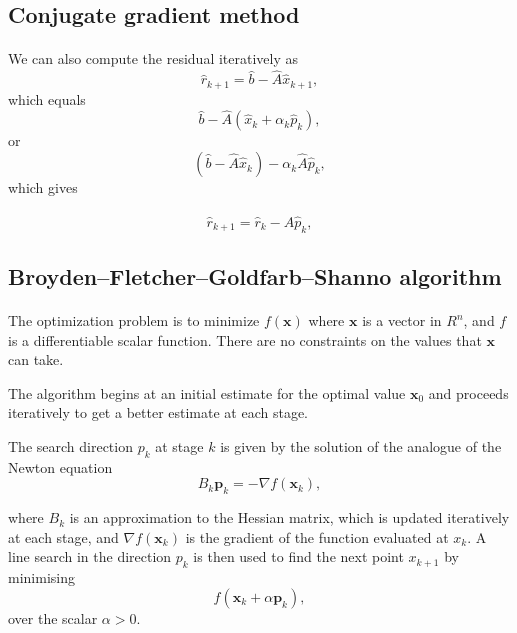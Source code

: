 \documentclass[%
oneside,                 %
final,                   %
10pt]{article}
\begin{document}
\subsection*{Conjugate gradient method}

\paragraph{}
We can also  compute the residual iteratively as
\begin{equation*}
\hat{r}_{k+1}=\hat{b}-\hat{A}\hat{x}_{k+1},
 \end{equation*}
which equals
\begin{equation*}
\hat{b}-\hat{A}(\hat{x}_k+\alpha_k\hat{p}_k),
 \end{equation*}
or
\begin{equation*}
(\hat{b}-\hat{A}\hat{x}_k)-\alpha_k\hat{A}\hat{p}_k,
 \end{equation*}
which gives

\begin{equation*}
\hat{r}_{k+1}=\hat{r}_k-\hat{A}\hat{p}_{k},
 \end{equation*}



\subsection*{Broyden–Fletcher–Goldfarb–Shanno algorithm}

\paragraph{}
The optimization problem is to minimize $f(\mathbf {x} )$ where $\mathbf {x}$  is a vector in $R^{n}$, and $f$ is a differentiable scalar function. There are no constraints on the values that  $\mathbf {x}$  can take.

The algorithm begins at an initial estimate for the optimal value $\mathbf {x}_{0}$ and proceeds iteratively to get a better estimate at each stage.

The search direction $p_k$ at stage $k$ is given by the solution of the analogue of the Newton equation
\[
B_{k}\mathbf {p} _{k}=-\nabla f(\mathbf {x}_{k}),
\]

where $B_{k}$ is an approximation to the Hessian matrix, which is
updated iteratively at each stage, and $\nabla f(\mathbf {x} _{k})$
is the gradient of the function
evaluated at $x_k$. 
A line search in the direction $p_k$ is then used to
find the next point $x_{k+1}$ by minimising 
\[
f(\mathbf {x}_{k}+\alpha \mathbf {p}_{k}),
\]
over the scalar $\alpha > 0$.
\end{document}

